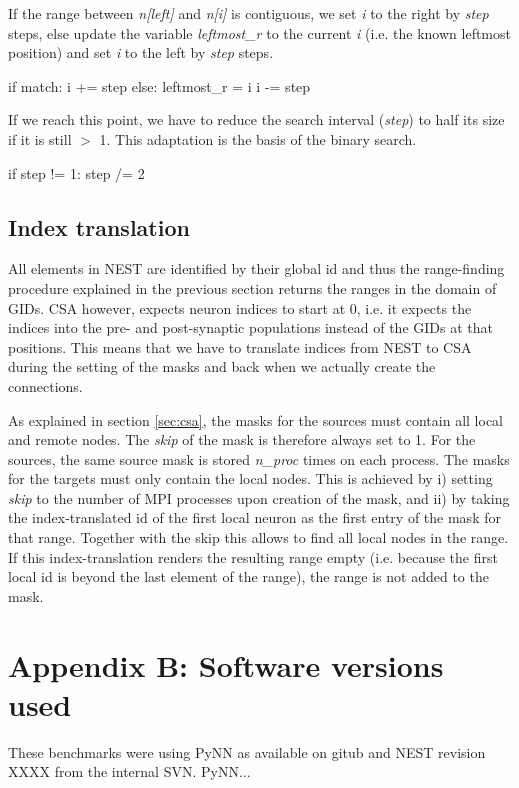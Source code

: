 \documentclass{frontiersSCNS} %
\begin{document}
If the range between \emph{n[left]} and \emph{n[i]} is contiguous, we
set \emph{i} to the right by \emph{step} steps, else update the
variable \emph{leftmost\_r} to the current \emph{i} (i.e. the known
leftmost position) and set \emph{i} to the left by \emph{step} steps.

\begin{pythoncode}
        if match:
            i += step
        else:
            leftmost_r = i
            i -= step
\end{pythoncode}

If we reach this point, we have to reduce the search interval
(\emph{step}) to half its size if it is still $>$ 1. This adaptation
is the basis of the binary search.

\begin{pythoncode}
        if step != 1:
            step /= 2
\end{pythoncode}

\subsection*{Index translation}

All elements in NEST are identified by their global id and thus the
range-finding procedure explained in the previous section returns the
ranges in the domain of GIDs. CSA however, expects neuron indices to
start at 0, i.e. it expects the indices into the pre- and
post-synaptic populations instead of the GIDs at that positions. This
means that we have to translate indices from NEST to CSA during the
setting of the masks and back when we actually create the connections.

As explained in section \ref{sec:csa}, the masks for the sources must
contain all local and remote nodes. The \emph{skip} of the mask is
therefore always set to 1. For the sources, the same source mask is
stored \emph{n\_proc} times on each process. The masks for the targets
must only contain the local nodes. This is achieved by i) setting
\emph{skip} to the number of MPI processes upon creation of the mask,
and ii) by taking the index-translated id of the first local neuron as
the first entry of the mask for that range. Together with the skip
this allows to find all local nodes in the range. If this
index-translation renders the resulting range empty (i.e. because the
first local id is beyond the last element of the range), the range is
not added to the mask.

\section*{Appendix B: Software versions used}

These benchmarks were using PyNN as available on gitub and NEST
revision XXXX from the internal SVN. PyNN...




\end{document}
